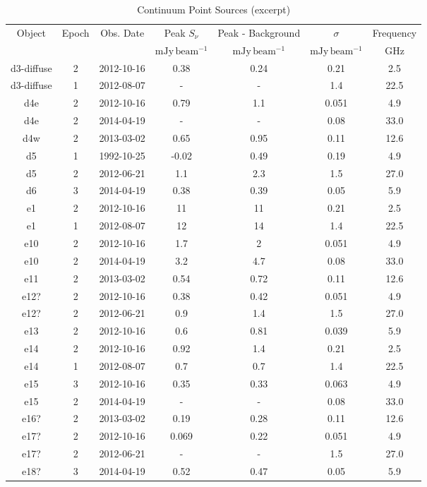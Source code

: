 \begin{table*}[htp]
\caption{Continuum Point Sources (excerpt)}
\begin{tabular}{ccccccc}
\label{tab:contsrcs}
Object & Epoch & Obs. Date & Peak $S_{\nu}$ & Peak - Background & $\sigma$ & Frequency \\
 &  &  & $\mathrm{mJy\,beam^{-1}}$ & $\mathrm{mJy\,beam^{-1}}$ & $\mathrm{mJy\,beam^{-1}}$ & $\mathrm{GHz}$ \\
\hline
d3-diffuse & 2 & 2012-10-16 & 0.38 & 0.24 & 0.21 & 2.5 \\
d3-diffuse & 1 & 2012-08-07 & - & - & 1.4 & 22.5 \\
d4e & 2 & 2012-10-16 & 0.79 & 1.1 & 0.051 & 4.9 \\
d4e & 2 & 2014-04-19 & - & - & 0.08 & 33.0 \\
d4w & 2 & 2013-03-02 & 0.65 & 0.95 & 0.11 & 12.6 \\
d5 & 1 & 1992-10-25 & -0.02 & 0.49 & 0.19 & 4.9 \\
d5 & 2 & 2012-06-21 & 1.1 & 2.3 & 1.5 & 27.0 \\
d6 & 3 & 2014-04-19 & 0.38 & 0.39 & 0.05 & 5.9 \\
e1 & 2 & 2012-10-16 & 11 & 11 & 0.21 & 2.5 \\
e1 & 1 & 2012-08-07 & 12 & 14 & 1.4 & 22.5 \\
e10 & 2 & 2012-10-16 & 1.7 & 2 & 0.051 & 4.9 \\
e10 & 2 & 2014-04-19 & 3.2 & 4.7 & 0.08 & 33.0 \\
e11 & 2 & 2013-03-02 & 0.54 & 0.72 & 0.11 & 12.6 \\
e12? & 2 & 2012-10-16 & 0.38 & 0.42 & 0.051 & 4.9 \\
e12? & 2 & 2012-06-21 & 0.9 & 1.4 & 1.5 & 27.0 \\
e13 & 2 & 2012-10-16 & 0.6 & 0.81 & 0.039 & 5.9 \\
e14 & 2 & 2012-10-16 & 0.92 & 1.4 & 0.21 & 2.5 \\
e14 & 1 & 2012-08-07 & 0.7 & 0.7 & 1.4 & 22.5 \\
e15 & 3 & 2012-10-16 & 0.35 & 0.33 & 0.063 & 4.9 \\
e15 & 2 & 2014-04-19 & - & - & 0.08 & 33.0 \\
e16? & 2 & 2013-03-02 & 0.19 & 0.28 & 0.11 & 12.6 \\
e17? & 2 & 2012-10-16 & 0.069 & 0.22 & 0.051 & 4.9 \\
e17? & 2 & 2012-06-21 & - & - & 1.5 & 27.0 \\
e18? & 3 & 2014-04-19 & 0.52 & 0.47 & 0.05 & 5.9 \\

\end{tabular}
\end{table*}
